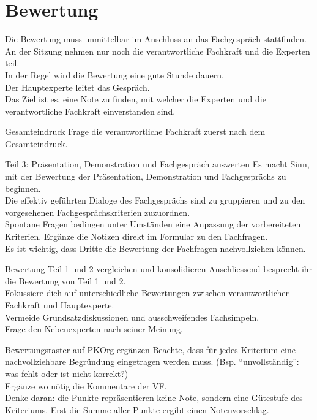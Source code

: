 \section{Bewertung}
Die Bewertung muss unmittelbar im Anschluss an das Fachgespräch stattfinden.\\An der Sitzung nehmen nur noch die verantwortliche Fachkraft und die Experten teil.\\In der Regel wird die Bewertung eine gute Stunde dauern.\\Der Hauptexperte leitet das Gespräch.\\Das Ziel ist es, eine Note zu finden, mit welcher die Experten und die verantwortliche Fachkraft einverstanden sind.

\begin{taskitem}{Gesamteindruck}
  Frage die verantwortliche Fachkraft zuerst nach dem Gesamteindruck.
\end{taskitem}
\begin{taskitem}{Teil 3: Präsentation, Demonstration und Fachgespräch auswerten}
  Es macht Sinn, mit der Bewertung der Präsentation, Demonstration und Fachgesprächs zu beginnen.\\Die effektiv geführten Dialoge des Fachgesprächs sind zu gruppieren und zu den vorgesehenen Fachgesprächskriterien zuzuordnen.\\Spontane Fragen bedingen unter Umständen eine Anpassung der vorbereiteten Kriterien. Ergänze die Notizen direkt im Formular zu den Fachfragen.\\Es ist wichtig, dass Dritte die Bewertung der Fachfragen nachvollziehen können.
\end{taskitem}
\newpage
\begin{taskitem}{Bewertung Teil 1 und 2 vergleichen und konsolidieren}
  Anschliessend besprecht ihr die Bewertung von Teil 1 und 2.\\Fokussiere dich auf unterschiedliche Bewertungen zwischen verantwortlicher Fachkraft und Hauptexperte.\\Vermeide Grundsatzdiskussionen und ausschweifendes Fachsimpeln.\\Frage den Nebenexperten nach seiner Meinung.
\end{taskitem}
\begin{taskitemwithoutcomment}{Bewertungsraster auf PKOrg ergänzen}
  Beachte, dass für jedes Kriterium eine nachvollziehbare Begründung eingetragen werden muss. (Bsp. \enquote{unvollständig}: was fehlt oder ist nicht korrekt?)\\Ergänze wo nötig die Kommentare der VF.\\Denke daran: die Punkte repräsentieren keine Note, sondern eine Gütestufe des Kriteriums. Erst die Summe aller Punkte ergibt einen Notenvorschlag.
\end{taskitemwithoutcomment}

